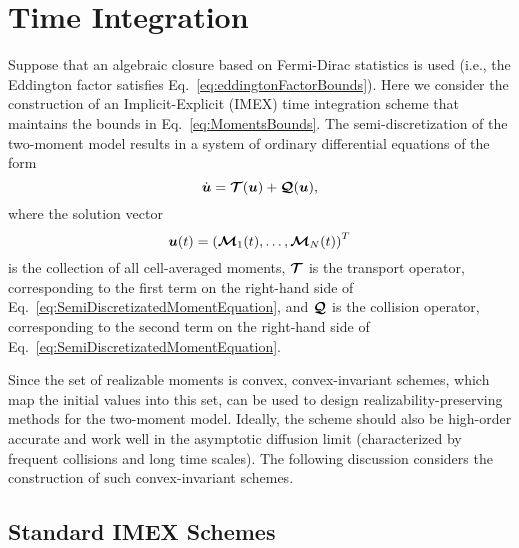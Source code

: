 \section{Time Integration} \label{se:TimeIntegration}

Suppose that an algebraic closure based on Fermi-Dirac statistics is used (i.e., the Eddington factor satisfies Eq.~\eqref{eq:eddingtonFactorBounds}).
Here we consider the construction of an Implicit-Explicit (IMEX) time integration scheme that maintains the bounds in Eq.~\eqref{eq:MomentsBounds}.  
The semi-discretization of the two-moment model results in a system of ordinary differential equations of the form
\begin{equation}
  \dot{\boldsymbol{u}} = \boldsymbol{\mathcal{T}}(\boldsymbol{u}) + \boldsymbol{\mathcal{Q}}(\boldsymbol{u}),
\end{equation}
where the solution vector
\begin{equation}
  \boldsymbol{u}(t) = \left( \boldsymbol{\mathcal{M}}_{1}(t),\ldots,\boldsymbol{\mathcal{M}}_{N}(t)\right) ^{T}
\end{equation}
is the collection of all cell-averaged moments, $\boldsymbol{\mathcal{T}}$ is the transport operator, corresponding to the first term on the right-hand side of Eq.~\eqref{eq:SemiDiscretizatedMomentEquation}, and $\boldsymbol{\mathcal{Q}}$ is the collision operator, corresponding to the second term on the right-hand side of Eq.~\eqref{eq:SemiDiscretizatedMomentEquation}.  

Since the set of realizable moments is convex, convex-invariant schemes, which map the initial values into this set, can be used to design realizability-preserving methods for the two-moment model.
Ideally, the scheme should also be high-order accurate and work well in the asymptotic diffusion limit (characterized by frequent collisions and long time scales).  
The following discussion considers the construction of such convex-invariant schemes.  

\subsection{Standard IMEX Schemes}


